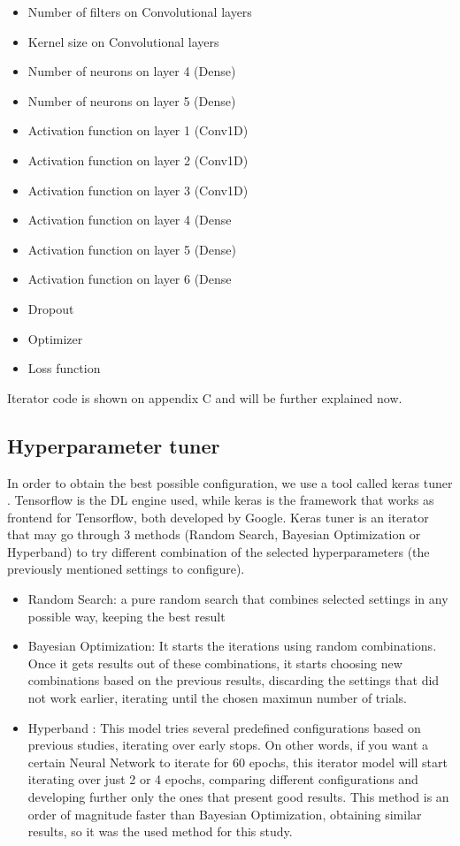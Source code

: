 \documentclass[openany]{article}
\begin{document}
\begin{itemize}
	\item Number of filters on Convolutional layers 
	\item Kernel size on Convolutional layers
	\item Number of neurons on layer 4 (Dense)
	\item Number of neurons on layer 5 (Dense)
	\item Activation function on layer 1 (Conv1D)
	\item Activation function on layer 2 (Conv1D)
	\item Activation function on layer 3 (Conv1D)
	\item Activation function on layer 4 (Dense
	\item Activation function on layer 5 (Dense)
	\item Activation function on layer 6 (Dense
	\item Dropout
	\item Optimizer
	\item Loss function

\end{itemize}

Iterator code is shown on appendix C and will be further explained now.

\subsection{Hyperparameter tuner}

In order to obtain the best possible configuration, we use a tool called keras tuner \cite{omalley2019kerastuner}. Tensorflow is the DL engine used, while keras is the framework that works as frontend for Tensorflow, both developed by Google. Keras tuner is an iterator that may go through 3 methods (Random Search, Bayesian Optimization or Hyperband) to try different combination of the selected hyperparameters (the previously mentioned settings to configure).

\begin{itemize}
    \item Random Search: a pure random search that combines selected settings in any possible way, keeping the best result
    \item Bayesian Optimization: It starts the iterations using random combinations. Once it gets results out of these combinations, it starts choosing new combinations based on the previous results, discarding the settings that did not work earlier, iterating until the chosen maximun number of trials. 
    \item Hyperband \cite{JMLR:v18:16-558}: This model tries several predefined configurations based on previous studies, iterating over early stops. On other words, if you want a certain Neural Network to iterate for 60 epochs, this iterator model will start iterating over just 2 or 4 epochs, comparing different configurations and developing further only the ones that present good results. This method is an order of magnitude faster than Bayesian Optimization, obtaining similar results, so it was the used method for this study.
\end{itemize}
\end{document}
